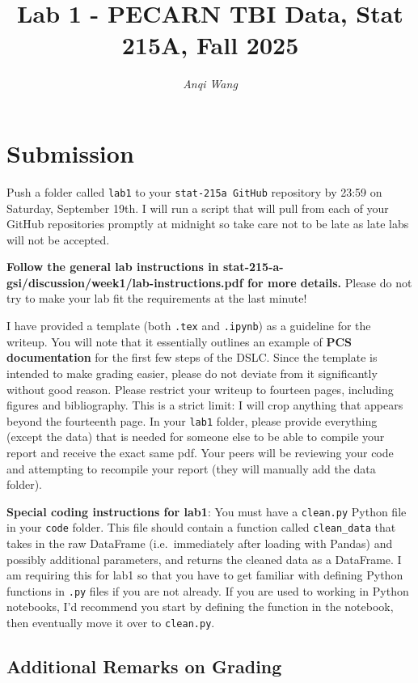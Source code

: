 \documentclass[10pt,letterpaper]{article}
\title{Lab 1 - PECARN TBI Data, Stat 215A, Fall 2025}
\author{\textit{Anqi Wang}}
\begin{document}
\maketitle

\section*{Submission}
Push a folder called \texttt{lab1} to your \texttt{stat-215a GitHub} repository by 23:59 on Saturday, September 19th. I will run a script that will pull from each of your GitHub repositories promptly at midnight so take care not to be late as late labs will not be accepted.

\textbf{Follow the general lab instructions in stat-215-a-gsi/discussion/week1/lab-instructions.pdf for more details.} Please do not try to make your lab fit the requirements at the last minute!

I have provided a template (both \texttt{.tex} and \texttt{.ipynb}) as a guideline for the writeup. You will note that it essentially outlines an example of \textbf{PCS documentation} for the first few steps of the DSLC. Since the template is intended to make grading easier, please do not deviate from it significantly without good reason. Please restrict your writeup to fourteen pages, including figures and bibliography. This is a strict limit: I will crop anything that appears beyond the fourteenth page. In your \texttt{lab1} folder, please provide everything (except the data) that is needed for someone else to be able to compile your report and receive the exact same pdf. Your peers will be reviewing your code and attempting to recompile your report (they will manually add the data folder).

\textbf{Special coding instructions for lab1}: You must have a \texttt{clean.py} Python file in your \texttt{code} folder. This file should contain a function called \texttt{clean\_data} that takes in the raw DataFrame (i.e.~immediately after loading with Pandas) and possibly additional parameters, and returns the cleaned data as a DataFrame. I am requiring this for lab1 so that you have to get familiar with defining Python functions in \texttt{.py} files if you are not already. If you are used to working in Python notebooks, I'd recommend you start by defining the function in the notebook, then eventually move it over to \texttt{clean.py}.

\subsection*{Additional Remarks on Grading}
\end{document}
